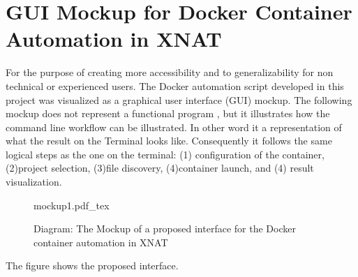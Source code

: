\section{GUI Mockup for Docker Container Automation in XNAT}

For the purpose of creating more accessibility and to generalizability for non technical or experienced users. The Docker automation script developed in this project was visualized as a graphical user interface (GUI) mockup.
The following mockup does not represent a functional program , but it illustrates how the command line workflow can be illustrated. In other word it a representation of what the result on the Terminal looks like. Consequently it follows the same logical steps as the one on the terminal: (1) configuration of the container, (2)project selection, (3)file discovery,  (4)container launch, and (4) result visualization.

\begin{figure}[ht]
  \centering
  \def\svgwidth{\linewidth}
  {mockup1.pdf_tex}
  \caption{Diagram: The Mockup of a proposed interface for the Docker container automation in XNAT}
  \label{fig:workflowxnat}
\end{figure}

The figure  shows the proposed interface. 
